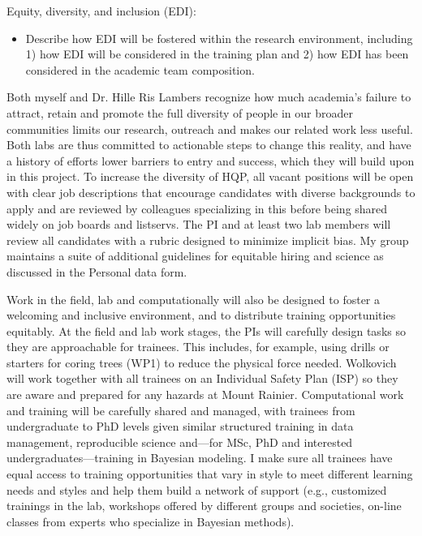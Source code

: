 \documentclass[12pt,oneside]{article}
\newenvironment{smitemize}{
\begin{itemize}
  \setlength{\itemsep}{1pt}
  \setlength{\parskip}{0pt}
  \setlength{\parsep}{0pt}}
{\end{itemize}
}
\begin{document}
{\sc Equity, diversity, and inclusion (EDI):}  %
\vspace{-1ex}
\begin{smitemize}
\item  Describe how EDI will be fostered within the research environment, including 1) how EDI will be considered in the training plan and 2) how EDI has been considered in the academic team composition.
\end{smitemize}
Both myself and Dr. Hille Ris Lambers recognize how much academia's failure to attract, retain and promote the full diversity of people in our broader communities limits our research, outreach and makes our related work less useful. Both labs are thus committed to actionable steps to change this reality, and have a history of efforts lower barriers to entry and success, which they will build upon in this project. To increase the diversity of HQP, all vacant positions will be open with clear job descriptions that encourage candidates with diverse backgrounds to apply and are reviewed by colleagues specializing in this before being shared widely on job boards and listservs.  The PI and at least two lab members will review all candidates with a rubric designed to minimize implicit bias. My group maintains a suite of additional guidelines for equitable hiring and science as discussed in the Personal data form. %

Work in the field, lab and computationally will also be designed to foster a welcoming and inclusive environment, and to distribute training opportunities equitably. At the field and lab work stages, the PIs will carefully design tasks so they are approachable for trainees. This includes, for example, using drills or starters for coring trees (WP1) to reduce the physical force needed.  Wolkovich will work together with all trainees on an Individual Safety Plan (ISP) so they are aware and prepared for any hazards at Mount Rainier.  Computational work and training will be carefully shared and managed, with trainees from undergraduate to PhD levels given similar structured training in data management, reproducible science and---for MSc, PhD and interested undergraduates---training in Bayesian modeling. I make sure all trainees have equal access to training opportunities that vary in style to meet different learning needs and styles and help them build a network of support (e.g., customized trainings in the lab, workshops offered by different groups and societies, on-line classes from experts who specialize in Bayesian methods). %
\end{document}
